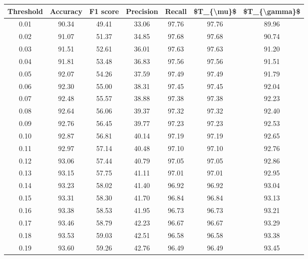 \begin{tabular}{|c|c|c|c|c|c|c|}
\hline
 Threshold &  Accuracy &  F1 score &  Precision &  Recall &  \$T\_\{\textbackslash mu\}\$ &  \$T\_\{\textbackslash gamma\}\$ \\
\hline
      0.01 &     90.34 &     49.41 &      33.06 &   97.76 &      97.76 &         89.96 \\
      0.02 &     91.07 &     51.37 &      34.85 &   97.68 &      97.68 &         90.74 \\
      0.03 &     91.51 &     52.61 &      36.01 &   97.63 &      97.63 &         91.20 \\
      0.04 &     91.81 &     53.48 &      36.83 &   97.56 &      97.56 &         91.51 \\
      0.05 &     92.07 &     54.26 &      37.59 &   97.49 &      97.49 &         91.79 \\
      0.06 &     92.30 &     55.00 &      38.31 &   97.45 &      97.45 &         92.04 \\
      0.07 &     92.48 &     55.57 &      38.88 &   97.38 &      97.38 &         92.23 \\
      0.08 &     92.64 &     56.06 &      39.37 &   97.32 &      97.32 &         92.40 \\
      0.09 &     92.76 &     56.45 &      39.77 &   97.23 &      97.23 &         92.53 \\
      0.10 &     92.87 &     56.81 &      40.14 &   97.19 &      97.19 &         92.65 \\
      0.11 &     92.97 &     57.14 &      40.48 &   97.10 &      97.10 &         92.76 \\
      0.12 &     93.06 &     57.44 &      40.79 &   97.05 &      97.05 &         92.86 \\
      0.13 &     93.15 &     57.75 &      41.11 &   97.01 &      97.01 &         92.95 \\
      0.14 &     93.23 &     58.02 &      41.40 &   96.92 &      96.92 &         93.04 \\
      0.15 &     93.31 &     58.30 &      41.70 &   96.84 &      96.84 &         93.13 \\
      0.16 &     93.38 &     58.53 &      41.95 &   96.73 &      96.73 &         93.21 \\
      0.17 &     93.46 &     58.79 &      42.23 &   96.67 &      96.67 &         93.29 \\
      0.18 &     93.53 &     59.03 &      42.51 &   96.58 &      96.58 &         93.38 \\
      0.19 &     93.60 &     59.26 &      42.76 &   96.49 &      96.49 &         93.45 \\

\end{tabular}
